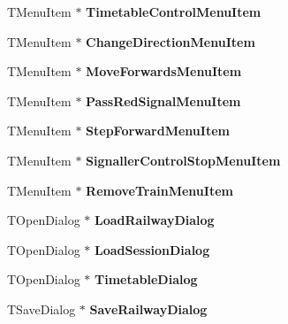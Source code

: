 \begin{DoxyCompactItemize}
T\+Menu\+Item $\ast$ {\bfseries Timetable\+Control\+Menu\+Item}
\item 
\mbox{\label{class_t_interface_a33602d7a6ab6abd00ef298f9e43c7ed1}} 
T\+Menu\+Item $\ast$ {\bfseries Change\+Direction\+Menu\+Item}
\item 
\mbox{\label{class_t_interface_aec930273d5d2aef93eda66a890856846}} 
T\+Menu\+Item $\ast$ {\bfseries Move\+Forwards\+Menu\+Item}
\item 
\mbox{\label{class_t_interface_ad807d344c8793fa5440e5f0d1e2eeed6}} 
T\+Menu\+Item $\ast$ {\bfseries Pass\+Red\+Signal\+Menu\+Item}
\item 
\mbox{\label{class_t_interface_a1334c491f0254679207838eb0f457bd5}} 
T\+Menu\+Item $\ast$ {\bfseries Step\+Forward\+Menu\+Item}
\item 
\mbox{\label{class_t_interface_ad296d1d02641e6ab1c736a5feefc0aea}} 
T\+Menu\+Item $\ast$ {\bfseries Signaller\+Control\+Stop\+Menu\+Item}
\item 
\mbox{\label{class_t_interface_a5471ec6f1a7b0b956c9faa1c6c30b672}} 
T\+Menu\+Item $\ast$ {\bfseries Remove\+Train\+Menu\+Item}
\item 
\mbox{\label{class_t_interface_ae2ab1b35577d8792f335abf9e79a4993}} 
T\+Open\+Dialog $\ast$ {\bfseries Load\+Railway\+Dialog}
\item 
\mbox{\label{class_t_interface_ae32059dc470055869c4a80f3a6bb2d89}} 
T\+Open\+Dialog $\ast$ {\bfseries Load\+Session\+Dialog}
\item 
\mbox{\label{class_t_interface_a758b51dda35130516245695b75927540}} 
T\+Open\+Dialog $\ast$ {\bfseries Timetable\+Dialog}
\item 
\mbox{\label{class_t_interface_a87004256f6d88054b975e72245b2f422}} 
T\+Save\+Dialog $\ast$ {\bfseries Save\+Railway\+Dialog}
\item 
\mbox{\label{class_t_interface_a3128e74692773ba42cbd127dfdbb190e}} 

\end{DoxyCompactItemize}
